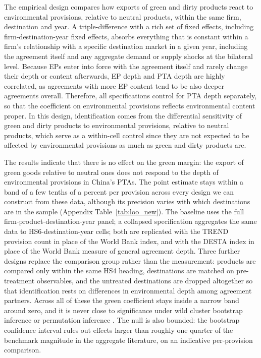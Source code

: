 \documentclass[12pt]{article}
\begin{document}
The empirical design compares how exports of green and dirty products react to environmental provisions, relative to neutral products, within the same firm, destination and year. A triple-difference with a rich set of fixed effects, including firm-destination-year fixed effects, absorbs everything that is constant within a firm's relationship with a specific destination market in a given year, including the agreement itself and any aggregate demand or supply shocks at the bilateral level. Because EPs enter into force with the agreement itself and rarely change their depth or content afterwards, EP depth and PTA depth are highly correlated, as agreements with more EP content tend to be also deeper agreements overall. Therefore, all specifications control for PTA depth separately, so that the coefficient on environmental provisions reflects environmental content proper. In this design, identification comes from the differential sensitivity of green and dirty products to environmental provisions, relative to neutral products, which serve as a within-cell control since they are not expected to be affected by environmental provisions as much as green and dirty products are.

The results indicate that there is no effect on the green margin: the export of green goods relative to neutral ones does not respond to the depth of environmental provisions in China's PTAs. The point estimate stays within a band of a few tenths of a percent per provision across every design we can construct from these data, although its precision varies with which destinations are in the sample (Appendix Table~\ref{tab:loo_new}). The baseline uses the full firm-product-destination-year panel; a collapsed specification aggregates the same data to HS6-destination-year cells; both are replicated with the TREND provision count in place of the World Bank index, and with the DESTA index in place of the World Bank measure of general agreement depth. Three further designs replace the comparison group rather than the measurement: products are compared only within the same HS4 heading, destinations are matched on pre-treatment observables, and the untreated destinations are dropped altogether so that identification rests on differences in environmental depth among agreement partners. Across all of these the green coefficient stays inside a narrow band around zero, and it is never close to significance under wild cluster bootstrap inference \citep{cameron2008} or permutation inference \citep{youngChannelingFisherRandomization2019}. The null is also bounded: the bootstrap confidence interval rules out effects larger than roughly one quarter of the benchmark magnitude in the aggregate literature, on an indicative per-provision comparison.
\end{document}
